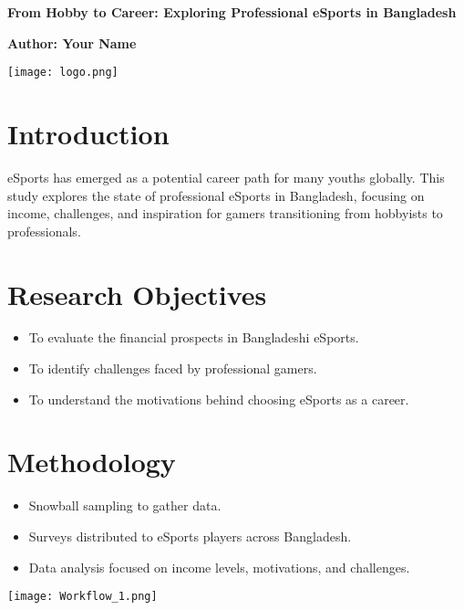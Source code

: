 \documentclass[a1paper,landscape]{a0poster}
\begin{document}
\begin{center}
    \veryHuge \textbf{From Hobby to Career: Exploring Professional eSports in Bangladesh} \par
    \vspace{1cm}
    \Huge \textbf{Author: Your Name} \par
    \vspace{1cm}
    \texttt{[image: logo.png]}
\end{center}

\vspace{2cm}

\begin{multicols}{3}

\section*{Introduction}
eSports has emerged as a potential career path for many youths globally. This study explores the state of professional eSports in Bangladesh, focusing on income, challenges, and inspiration for gamers transitioning from hobbyists to professionals.

\section*{Research Objectives}
\begin{itemize}
    \item To evaluate the financial prospects in Bangladeshi eSports.
    \item To identify challenges faced by professional gamers.
    \item To understand the motivations behind choosing eSports as a career.
\end{itemize}

\section*{Methodology}
\begin{itemize}
    \item Snowball sampling to gather data.
    \item Surveys distributed to eSports players across Bangladesh.
    \item Data analysis focused on income levels, motivations, and challenges.
\end{itemize}

\texttt{[image: Workflow\_1.png]}


\end{multicols}
\end{document}
